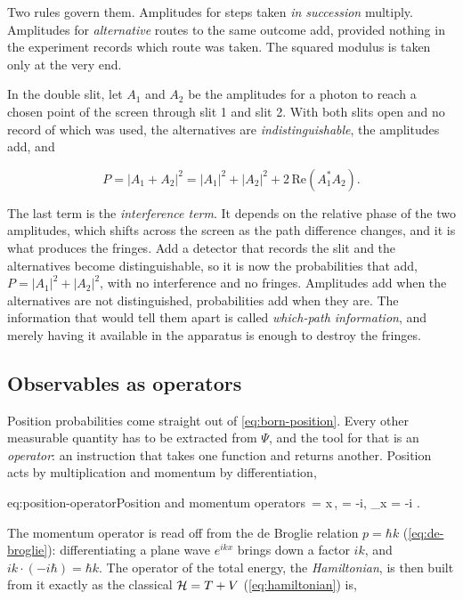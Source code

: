         Two rules govern them. Amplitudes for steps taken \emph{in succession} multiply. Amplitudes for \emph{alternative} routes to the same outcome add, provided nothing in the experiment records which route was taken. The squared modulus is taken only at the very end.

        In the double slit, let $A_{1}$ and $A_{2}$ be the amplitudes for a photon to reach a chosen point of the screen through slit 1 and slit 2. With both slits open and no record of which was used, the alternatives are \emph{indistinguishable}, the amplitudes add, and

        \begin{equation*}
            P = |A_{1} + A_{2}|^{2} = |A_{1}|^{2} + |A_{2}|^{2} + 2\,\mathrm{Re}\!\left(A_{1}^{*}A_{2}\right).
        \end{equation*}

        The last term is the \emph{interference term}. It depends on the relative phase of the two amplitudes, which shifts across the screen as the path difference changes, and it is what produces the fringes. Add a detector that records the slit and the alternatives become distinguishable, so it is now the probabilities that add, $P = |A_{1}|^{2} + |A_{2}|^{2}$, with no interference and no fringes. Amplitudes add when the alternatives are not distinguished, probabilities add when they are. The information that would tell them apart is called \emph{which-path information}, and merely having it available in the apparatus is enough to destroy the fringes.

    \subsection{Observables as operators}

        Position probabilities come straight out of \cref{eq:born-position}. Every other measurable quantity has to be extracted from $\Psi$, and the tool for that is an \emph{operator}: an instruction that takes one function and returns another. Position acts by multiplication and momentum by differentiation,

        \begin{keyeq}{eq:position-operator}{Position and momentum operators}
            \,\Psi = x\,\Psi, \qquad
             = -i\hbar\nabla, \qquad
            _{x} = -i\hbar{} .
        \end{keyeq}

        The momentum operator is read off from the de Broglie relation $p = \hbar k$ (\cref{eq:de-broglie}): differentiating a plane wave $e^{ikx}$ brings down a factor $ik$, and $ik \cdot (-i\hbar) = \hbar k$. The operator of the total energy, the \emph{Hamiltonian}, is then built from it exactly as the classical $\mathcal{H} = T + V$ (\cref{eq:hamiltonian}) is,

